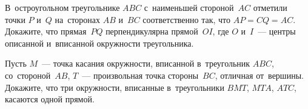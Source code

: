 \begin{problems}
\item
В~остроугольном треугольнике $ABC$ с~наименьшей стороной~$AC$ отметили
точки $P$ и~$Q$ на~сторонах $AB$ и~$BC$ соответственно так, что $AP = CQ = AC$.
Докажите, что прямая~$PQ$ перпендикулярна прямой~$OI$, где $O$ и~$I$~---
центры описанной и~вписанной окружности треугольника.

\item
Пусть $M$~--- точка касания окружности, вписанной в~треугольник $ABC$,
со~стороной~$AB$, $T$~--- произвольная точка стороны~$BC$, отличная от~вершины.
Докажите, что три окружности, вписанные в~треугольники $BMT$, $MTA$, $ATC$,
касаются одной прямой.

\end{problems}

